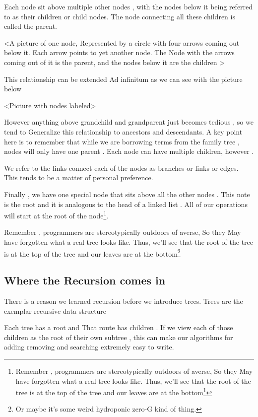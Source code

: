 Each node sit above multiple other nodes , with the nodes below it being referred to as their children or child nodes.  The node connecting all these children is called the parent.

<A picture of one node, Represented by a circle with four arrows coming out below it. Each arrow points to yet another node.  The Node with the arrows coming out of it is the parent, and the nodes below it are the children >


This relationship can be extended Ad infinitum as we can see with the picture below 


<Picture with nodes labeled>


However anything above grandchild and grandparent just becomes tedious , so we tend to  Generalize this relationship to ancestors and descendants.  A key point here is to remember that while we are borrowing terms from the family tree , nodes will only have one parent . Each node can have multiple children, however .


We refer to the links connect each of the nodes as branches or links or edges.  This tends to be a matter of personal preference.



Finally , we have one special node that sits above all the other nodes . This note is the root and it is analogous to the head of a linked list . All of our operations will start at the root of the node\footnote{Remember , programmers are stereotypically outdoors of averse, So they May have forgotten what a real tree looks like.  Thus, we'll see that the root of the tree is at the top of the tree and our leaves are at the bottom\footnote{Or maybe it's some weird hydroponic zero-G kind of thing.}}.


Remember , programmers are stereotypically outdoors of averse, So they May have forgotten what a real tree looks like.  Thus, we'll see that the root of the tree is at the top of the tree and our leaves are at the bottom\footnote{Or maybe it's some weird hydroponic zero-G kind of thing.}


\subsection{Where the  Recursion comes in}
There is a reason we learned recursion before we introduce trees. Trees are the exemplar recursive data structure

Each tree has a root and That route has children .  If we view each of those children as the root of their own subtree , this can make our algorithms for adding removing and searching extremely easy to write.

